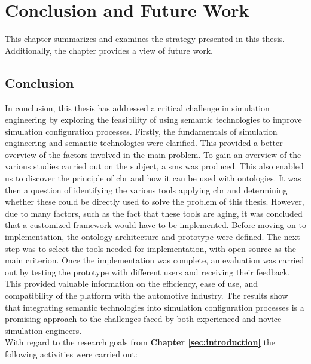 \section{Conclusion and Future Work\label{sec:conclusion}}

This chapter summarizes and examines the strategy presented in this thesis. Additionally, the chapter provides a view of future work.

\subsection{Conclusion}

In conclusion, this thesis has addressed a critical challenge in simulation engineering by exploring the feasibility of using semantic technologies to improve simulation configuration processes. Firstly, the fundamentals of simulation engineering and semantic technologies were clarified. This provided a better overview of the factors involved in the main problem. To gain an overview of the various studies carried out on the subject, a \acrshort{sms} was produced. This also enabled us to discover the principle of \acrshort{cbr} and how it can be used with ontologies. It was then a question of identifying the various tools applying \acrshort{cbr} and determining whether these could be directly used to solve the problem of this thesis. However, due to many factors, such as the fact that these tools are aging, it was concluded that a customized framework would have to be implemented. Before moving on to implementation, the ontology architecture and prototype were defined. The next step was to select the tools needed for implementation, with open-source as the main criterion. Once the implementation was complete, an evaluation was carried out by testing the prototype with different users and receiving their feedback. This provided valuable information on the efficiency, ease of use, and compatibility of the platform with the automotive industry. The results show that integrating semantic technologies into simulation configuration processes is a promising approach to the challenges faced by both experienced and novice simulation engineers.\\

With regard to the research goals from \textbf{Chapter \ref{sec:introduction}} the following activities
were carried out:

